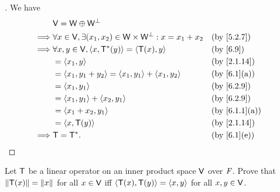 \begin{proof}[]
	We have
	\begin{align*}
		         & \V = \W \oplus \W^{\perp}                                                                        \\
		\implies & \forall x \in \V, \exists (x_1, x_2) \in \W \times \W^{\perp} : x = x_1 + x_2 &  & \by{5.2.7}    \\
		\implies & \forall x, y \in \V, \inn{x, \T^*(y)} = \inn{\T(x), y}                        &  & \by{6.9}      \\
		         & = \inn{x_1, y}                                                                &  & \by{2.1.14}   \\
		         & = \inn{x_1, y_1 + y_2} = \inn{x_1, y_1} + \inn{x_1, y_2}                      &  & \by{6.1}[a]   \\
		         & = \inn{x_1, y_1}                                                              &  & \by{6.2.9}    \\
		         & = \inn{x_1, y_1} + \inn{x_2, y_1}                                             &  & \by{6.2.9}    \\
		         & = \inn{x_1 + x_2, y_1}                                                        &  & \by{6.1.1}[a] \\
		         & = \inn{x, \T(y)}                                                              &  & \by{2.1.14}   \\
		\implies & \T = \T^*.                                                                    &  & \by{6.1}[e]
	\end{align*}
\end{proof}

\begin{ex}\label{ex:6.3.10}
	Let \(\mathsf{T}\) be a linear operator on an inner product space \(\mathsf{V}\) over \(\mathit{F}\).
	Prove that \(\left\lVert\mathsf{T}(x)\right\rVert = \left\lVert x\right\rVert\) for all \(x \in \mathsf{V}\) iff \(\left\langle\mathsf{T}(x), \mathsf{T}(y)\right\rangle = \left\langle x,y\right\rangle\) for all \(x, y \in \mathsf{V}\).
\end{ex}

